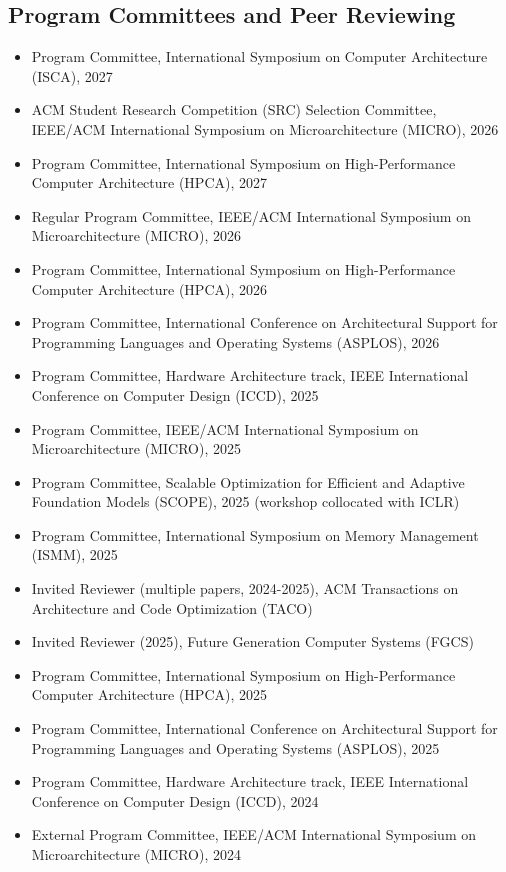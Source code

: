 \documentclass[singlecolumn,singlespace,11pt,a4paper]{article}
\begin{document}
\subsection*{Program Committees and Peer Reviewing}
\begin{itemize}
\item Program Committee, International Symposium on Computer Architecture (ISCA), 2027
\item ACM Student Research Competition (SRC) Selection Committee, IEEE/ACM International Symposium on Microarchitecture (MICRO), 2026
\item Program Committee, International Symposium on High-Performance Computer Architecture (HPCA), 2027
\item Regular Program Committee, IEEE/ACM International Symposium on Microarchitecture (MICRO), 2026
\item Program Committee, International Symposium on High-Performance Computer Architecture (HPCA), 2026
\item Program Committee, International Conference on Architectural Support for Programming Languages and Operating Systems (ASPLOS), 2026
\item Program Committee, Hardware Architecture track, IEEE International Conference on Computer Design (ICCD), 2025 
\item Program Committee, IEEE/ACM International Symposium on Microarchitecture (MICRO), 2025
\item Program Committee, Scalable Optimization for Efficient and Adaptive Foundation Models (SCOPE), 2025 (workshop collocated with ICLR)
\item Program Committee, International Symposium on Memory Management (ISMM), 2025
\item Invited Reviewer (multiple papers, 2024-2025), ACM Transactions on Architecture and Code Optimization (TACO)
\item Invited Reviewer (2025), Future Generation Computer Systems (FGCS)
\item Program Committee, International Symposium on High-Performance Computer Architecture (HPCA), 2025
\item Program Committee, International Conference on Architectural Support for Programming Languages and Operating Systems (ASPLOS), 2025
\item Program Committee, Hardware Architecture track, IEEE International Conference on Computer Design (ICCD), 2024 
\item External Program Committee, IEEE/ACM International Symposium on Microarchitecture (MICRO), 2024

\end{itemize}
\end{document}

